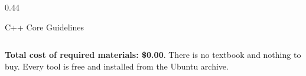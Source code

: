 \documentclass[
    10pt,
    dvipsnames,
    svgnames,
    x11names,
    aspectratio=1610,
    english,
    codeminted]{beamer}
\begin{document}
\begin{frame}{\secname}
\begin{columns}[T,onlytextwidth]
\begin{column}{0.44\textwidth}
\medskip
{}
\begin{compactitem}
\footnotesize
    \item {}
    \item C++ Core Guidelines
    \item {}
\end{compactitem}
\end{column}
\end{columns}
\begin{MyBox}
\footnotesize
\textbf{Total cost of required materials: \$0.00}. There is no textbook and nothing to buy. Every tool is free and installed from the Ubuntu archive.
\end{MyBox}
\end{frame}
\endgroup

\end{document}

